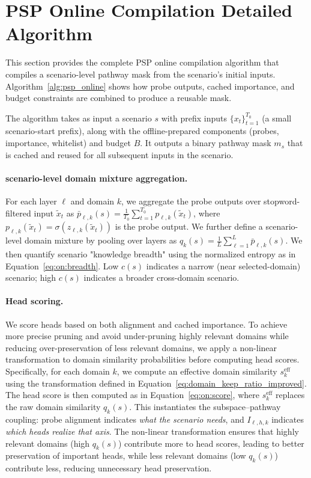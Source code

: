 \section{PSP Online Compilation Detailed Algorithm}
\label{app:psp_online_details}

This section provides the complete PSP online compilation algorithm that compiles a scenario-level pathway mask from the scenario's initial inputs.
Algorithm~\ref{alg:psp_online} shows how probe outputs, cached importance, and budget constraints are combined to produce a reusable mask.

The algorithm takes as input a scenario $s$ with prefix inputs $\{x_t\}_{t=1}^{T_0}$ (a small scenario-start prefix), along with the offline-prepared components (probes, importance, whitelist) and budget $B$.
It outputs a binary pathway mask $m_s$ that is cached and reused for all subsequent inputs in the scenario.

\paragraph{scenario-level domain mixture aggregation.}
For each layer $\ell$ and domain $k$, we aggregate the probe outputs over stopword-filtered input $\tilde{x}_t$ as $\bar{p}_{\ell,k}(s) = \frac{1}{T_0} \sum_{t=1}^{T_0} p_{\ell,k}(\tilde{x}_t)$, where $p_{\ell,k}(\tilde{x}_t) = \sigma(z_{\ell,k}(\tilde{x}_t))$ is the probe output.
We further define a scenario-level domain mixture by pooling over layers as $q_k(s) = \frac{1}{L} \sum_{\ell=1}^{L} \bar{p}_{\ell,k}(s)$.
We then quantify scenario "knowledge breadth" using the normalized entropy as in Equation~\eqref{eq:on:breadth}.
Low $c(s)$ indicates a narrow (near selected-domain) scenario; high $c(s)$ indicates a broader cross-domain scenario.

\paragraph{Head scoring.}
We score heads based on both alignment and cached importance.
To achieve more precise pruning and avoid under-pruning highly relevant domains while reducing over-preservation of less relevant domains, we apply a non-linear transformation to domain similarity probabilities before computing head scores.
Specifically, for each domain $k$, we compute an effective domain similarity $s_k^{\text{eff}}$ using the transformation defined in Equation~\eqref{eq:domain_keep_ratio_improved}.
The head score is then computed as in Equation~\eqref{eq:on:score}, where $s_k^{\text{eff}}$ replaces the raw domain similarity $q_k(s)$.
This instantiates the subspace--pathway coupling: probe alignment indicates \emph{what the scenario needs}, and $I_{\ell,h,k}$ indicates \emph{which heads realize that axis}.
The non-linear transformation ensures that highly relevant domains (high $q_k(s)$) contribute more to head scores, leading to better preservation of important heads, while less relevant domains (low $q_k(s)$) contribute less, reducing unnecessary head preservation.

